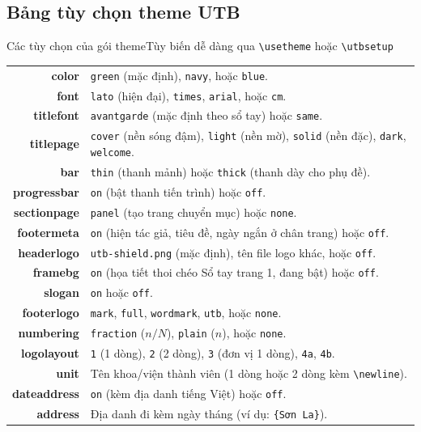 \documentclass[aspectratio=43,10pt]{beamer}
\begin{document}
\subsection{Bảng tùy chọn theme UTB}
\begin{frame}{Các tùy chọn của gói theme}{Tùy biến dễ dàng qua \texttt{\textbackslash usetheme} hoặc \texttt{\textbackslash utbsetup}}
  \scriptsize
  \centering
  \begin{tabularx}{\textwidth}{>{\ttfamily\bfseries\color{utbmain}}r >{\small}X}
    color       & \texttt{green} (mặc định), \texttt{navy}, hoặc \texttt{blue}. \\
    font        & \texttt{lato} (hiện đại), \texttt{times}, \texttt{arial}, hoặc \texttt{cm}. \\
    titlefont   & \texttt{avantgarde} (mặc định theo sổ tay) hoặc \texttt{same}. \\
    titlepage   & \texttt{cover} (nền sóng đậm), \texttt{light} (nền mờ), \texttt{solid} (nền đặc), \texttt{dark}, \texttt{welcome}. \\
    bar         & \texttt{thin} (thanh mảnh) hoặc \texttt{thick} (thanh dày cho phụ đề). \\
    progressbar & \texttt{on} (bật thanh tiến trình) hoặc \texttt{off}. \\
    sectionpage & \texttt{panel} (tạo trang chuyển mục) hoặc \texttt{none}. \\
    footermeta  & \texttt{on} (hiện tác giả, tiêu đề, ngày ngắn ở chân trang) hoặc \texttt{off}. \\
    headerlogo  & \texttt{utb-shield.png} (mặc định), tên file logo khác, hoặc \texttt{off}. \\
    framebg     & \texttt{on} (họa tiết thoi chéo Sổ tay trang 1, đang bật) hoặc \texttt{off}. \\
    slogan      & \texttt{on} hoặc \texttt{off}. \\
    footerlogo  & \texttt{mark}, \texttt{full}, \texttt{wordmark}, \texttt{utb}, hoặc \texttt{none}. \\
    numbering   & \texttt{fraction} ($n/N$), \texttt{plain} ($n$), hoặc \texttt{none}. \\
    logolayout  & \texttt{1} (1 dòng), \texttt{2} (2 dòng), \texttt{3} (đơn vị 1 dòng), \texttt{4a}, \texttt{4b}. \\
    unit        & Tên khoa/viện thành viên (1 dòng hoặc 2 dòng kèm \texttt{\textbackslash newline}). \\
    dateaddress & \texttt{on} (kèm địa danh tiếng Việt) hoặc \texttt{off}. \\
    address     & Địa danh đi kèm ngày tháng (ví dụ: \texttt{\{Sơn La\}}). \\
  \end{tabularx}
\end{frame}
\end{document}
